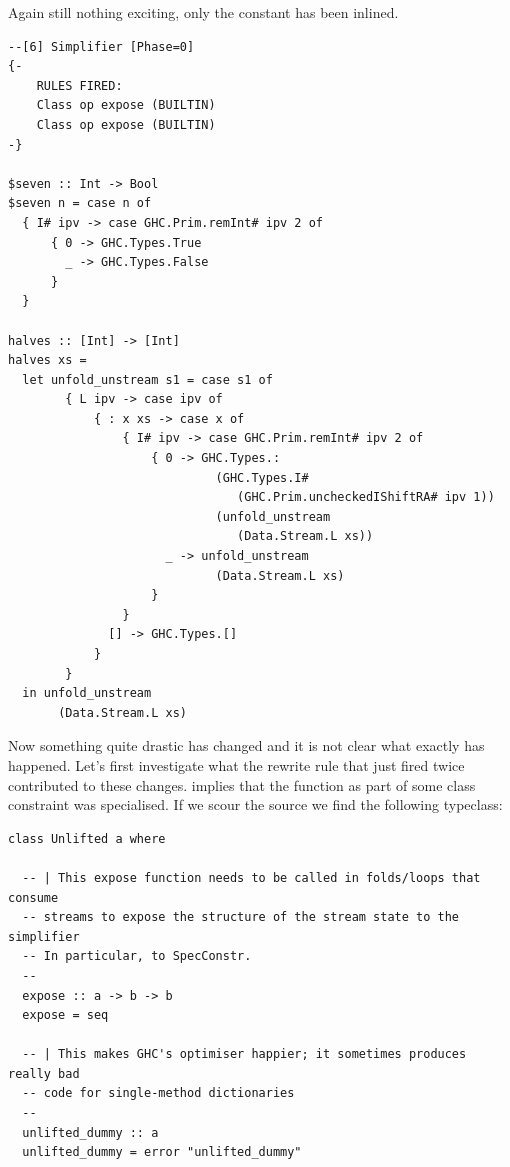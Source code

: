 Again still nothing exciting, only the  constant has been inlined.

\begin{listing}[H]
\begin{verbatim}
--[6] Simplifier [Phase=0]
{-
    RULES FIRED:
    Class op expose (BUILTIN)
    Class op expose (BUILTIN)
-}

$seven :: Int -> Bool
$seven n = case n of
  { I# ipv -> case GHC.Prim.remInt# ipv 2 of
      { 0 -> GHC.Types.True
        _ -> GHC.Types.False
      }
  }

halves :: [Int] -> [Int]
halves xs = 
  let unfold_unstream s1 = case s1 of
        { L ipv -> case ipv of
            { : x xs -> case x of
                { I# ipv -> case GHC.Prim.remInt# ipv 2 of
                    { 0 -> GHC.Types.:
                             (GHC.Types.I#
                                (GHC.Prim.uncheckedIShiftRA# ipv 1))
                             (unfold_unstream
                                (Data.Stream.L xs))
                      _ -> unfold_unstream
                             (Data.Stream.L xs)
                    }
                }
              [] -> GHC.Types.[]
            }
        }
  in unfold_unstream
       (Data.Stream.L xs)
\end{verbatim}
\end{listing}

Now something quite drastic has changed and it is not clear what exactly has happened. Let's first investigate
what the rewrite rule that just fired twice contributed to these changes.  implies that the 
function  as part of some class constraint was specialised. If we scour the source we find the following
typeclass:

\begin{listing}[H]
\begin{verbatim}
class Unlifted a where

  -- | This expose function needs to be called in folds/loops that consume
  -- streams to expose the structure of the stream state to the simplifier
  -- In particular, to SpecConstr.
  --
  expose :: a -> b -> b
  expose = seq

  -- | This makes GHC's optimiser happier; it sometimes produces really bad
  -- code for single-method dictionaries
  --
  unlifted_dummy :: a
  unlifted_dummy = error "unlifted_dummy"
\end{verbatim}
\end{listing}

